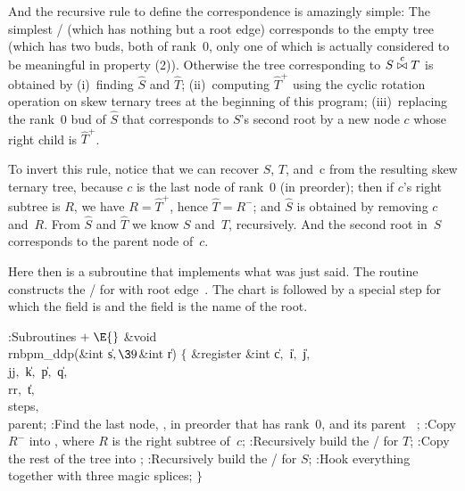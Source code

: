 And the recursive rule to define the correspondence is amazingly simple:
The simplest \RNBPM/ (which has nothing but a root edge) corresponds to the
empty tree (which has two buds, both of rank~0, only one of which is actually
considered to be meaningful in property (2)).
Otherwise the tree corresponding to $S\join c T$ is obtained by
(i)~finding $\widehat S$ and $\widehat T$;
(ii)~computing $\widehat T^+$ using the cyclic rotation operation
on skew ternary trees at the beginning of this program;
(iii)~replacing the rank~0 bud of $\widehat S$ that
corresponds to $S$'s second root by a new node $c$ whose right
child is $\widehat T^+$.

To invert this rule, notice that we can recover $S$, $T$, and~c
from the resulting skew ternary tree, because $c$ is the last
node of rank~0 (in preorder); then if $c$'s right subtree is
$R$, we have $R=\widehat T^+$, hence $\widehat T=R^-$; and $\widehat S$ is
obtained by removing $c$ and~$R$. From $\widehat S$ and $\widehat T$
we know $S$ and~$T$, recursively. And the second root
in~$S$ corresponds to the parent node of~$c$.

\fi

Here then is a subroutine that implements what was just said.
The  routine constructs the
\RNBPM/ for 
with root edge~. The chart is followed by a special step
for which the  field is  and the 
field
is the name of the root.

\Y\B\4:Subroutines\X${}\mathrel+\E{}$\6
\&{void} \\{rnbpm\_ddp}(\&{int} \|s${},\39{}$\&{int} \|r)\1\1\2\2\6
${}\{{}$\1\6
\&{register} \&{int} \|c${},{}$ \|i${},{}$ \|j${},{}$ \\{jj}${},{}$ \|k${},{}$ %
\|p${},{}$ \|q${},{}$ \\{rr}${},{}$ \|t${},{}$ \\{steps}${},{}$ \\{parent};\7
:Find the last node, , in preorder that has rank~0, and its parent~%
\X;\6
:Copy $R^-$ into , where $R$ is the right
subtree of~$c$\X;\6
:Recursively build the \RNBPM/ for $T$\X;\6
:Copy the rest of the tree into \X;\6
:Recursively build the \RNBPM/ for $S$\X;\6
:Hook everything together with three magic splices\X;\6
\4${}\}{}$\2\par
\fi


